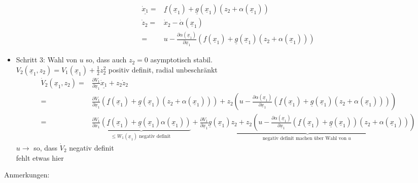 \documentclass[11pt,a4paper]{article}
\begin{document}
\begin{itemize}
\begin{align*}
\underline {\dot x_1} =& \underline f(\underline x_1) + \underline g(\underline x_1) (z_2 + \alpha(\underline x_1))\\
\dot z_2 = & \dot x_2 - \dot \alpha(\underline x_1)\\
=& u - \frac{\partial \alpha(\underline x_1)}{\partial \underline x_1} (f(\underline x_1) + \underline g(\underline x_1)(z_2 + \alpha(\underline x_1)) )
\end{align*}
\item Schritt 3: Wahl von $ u $ so, dass auch $z_2 = 0$ asymptotisch stabil.\\ $V_2(\underline x_1,z_2) = V_1(\underline x_1) + \frac{1}{2}z_2^2$ positiv definit, radial unbeschränkt\\
\begin{align*}
\dot V_2(\underline x_1, z_2) =& \frac{\partial V_1}{\partial \underline x_1} \underline{\dot x_1} + z_2 \dot z_2\\
=& \frac{\partial V_1}{\partial \underline x_1} \left(\underline f(\underline x_1)+ \underline g(\underline x_1)(z_2 + \alpha(\underline x_1)) \right) + z_2\left(u -\frac{\partial \alpha(\underline x_1)}{\partial \underline x_1} (\underline f(\underline x_1) + \underline g(\underline x_1)(z_2 + \alpha(\underline x_1) ) ) \right)\\
=& \underbrace{\frac{\partial V_1}{\partial x_1}(\underline f(\underline x_1) + \underline g(\underline x_1)\alpha(\underline x_1) ) }_{\le W_1(\underline x_1) \text{ negativ definit }} + \underbrace{\frac{\partial V_1}{\partial \underline x_1}\underline g(\underline x_1) z_2 + z_2\left(u - \frac{\partial \alpha(\underline x_1)}{\partial \underline x_1} (\underline f(\underline x_1) + \underline g(\underline x_1))(z_2 + \alpha(\underline x_1) ) \right) }_{\text{ negativ definit machen über Wahl von $u$ }}
\end{align*}
$u \rightarrow $ so, dass $\dot V_2$ negativ definit \\fehlt etwas hier
\end{itemize}
Anmerkungen: 
\end{document}
